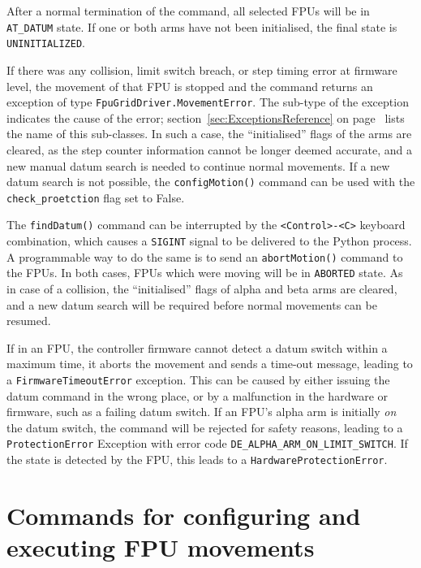 \documentclass[fontsize=12,a4paper]{scrreprt}
\begin{document}
After a normal termination of the command, all selected FPUs will be
in \texttt{AT\_DATUM} state. If one or both arms have not been
initialised, the final state is \texttt{UNINITIALIZED}.

\begin{sloppypar}
If there was any collision, limit switch breach, or step timing error
at firmware level, the movement of that FPU is stopped and the command
returns an exception of type \texttt{FpuGridDriver.MovementError}. The
sub-type of the exception indicates the cause of the error;
section~\ref{sec:ExceptionsReference} on
page~\pageref{sec:ExceptionsReference} lists the name of this
sub-classes. In such a case, the ``initialised'' flags of the arms
are cleared, as the step counter information cannot be longer deemed
accurate, and a new manual datum search is needed to continue normal
movements. If a new datum search is not possible, the
\texttt{configMotion()} command can be used with the
\texttt{check\_proetction} flag set to False.
\end{sloppypar}


The \texttt{findDatum()} command can be interrupted by the
\texttt{<Control>-<C>} keyboard combination, which causes a
\texttt{SIGINT} signal to be delivered to the Python process. A
programmable way to do the same is to send an \texttt{abortMotion()}
command to the FPUs.  In both cases, FPUs which were moving will be in
\texttt{ABORTED} state. As in case of a collision, the ``initialised''
flags of alpha and beta arms are cleared, and a new datum search will
be required before normal movements can be resumed.

If in an FPU, the controller firmware cannot detect a datum switch
within a maximum time, it aborts the movement and sends a time-out
message, leading to a \texttt{FirmwareTimeoutError} exception. This
can be caused by either issuing the datum command in the wrong place,
or by a malfunction in the hardware or firmware, such as a failing
datum switch. If an FPU's alpha arm is initially \emph{on} the datum
switch, the command will be rejected for safety reasons, leading to a
\texttt{ProtectionError} Exception with error code
\verb+DE_ALPHA_ARM_ON_LIMIT_SWITCH+. If the state is detected by the
FPU, this leads to a \texttt{HardwareProtectionError}.



\chapter{Commands for configuring and executing FPU movements}
\end{document}
